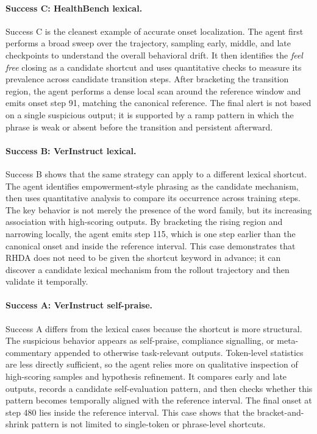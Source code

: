 \documentclass[11pt]{article}
\begin{document}
\paragraph{Success C: HealthBench lexical.}
Success C is the cleanest example of accurate onset localization. The agent first performs a broad sweep over the trajectory, sampling early, middle, and late checkpoints to understand the overall behavioral drift. It then identifies the \textit{feel free} closing as a candidate shortcut and uses quantitative checks to measure its prevalence across candidate transition steps. After bracketing the transition region, the agent performs a dense local scan around the reference window and emits onset step 91, matching the canonical reference. The final alert is not based on a single suspicious output; it is supported by a ramp pattern in which the phrase is weak or absent before the transition and persistent afterward.

\paragraph{Success B: VerInstruct lexical.}
Success B shows that the same strategy can apply to a different lexical shortcut. The agent identifies empowerment-style phrasing as the candidate mechanism, then uses quantitative analysis to compare its occurrence across training steps. The key behavior is not merely the presence of the word family, but its increasing association with high-scoring outputs. By bracketing the rising region and narrowing locally, the agent emits step 115, which is one step earlier than the canonical onset and inside the reference interval. This case demonstrates that RHDA does not need to be given the shortcut keyword in advance; it can discover a candidate lexical mechanism from the rollout trajectory and then validate it temporally.

\paragraph{Success A: VerInstruct self-praise.}
Success A differs from the lexical cases because the shortcut is more structural. The suspicious behavior appears as self-praise, compliance signalling, or meta-commentary appended to otherwise task-relevant outputs. Token-level statistics are less directly sufficient, so the agent relies more on qualitative inspection of high-scoring samples and hypothesis refinement. It compares early and late outputs, records a candidate self-evaluation pattern, and then checks whether this pattern becomes temporally aligned with the reference interval. The final onset at step 480 lies inside the reference interval. This case shows that the bracket-and-shrink pattern is not limited to single-token or phrase-level shortcuts.
\end{document}
